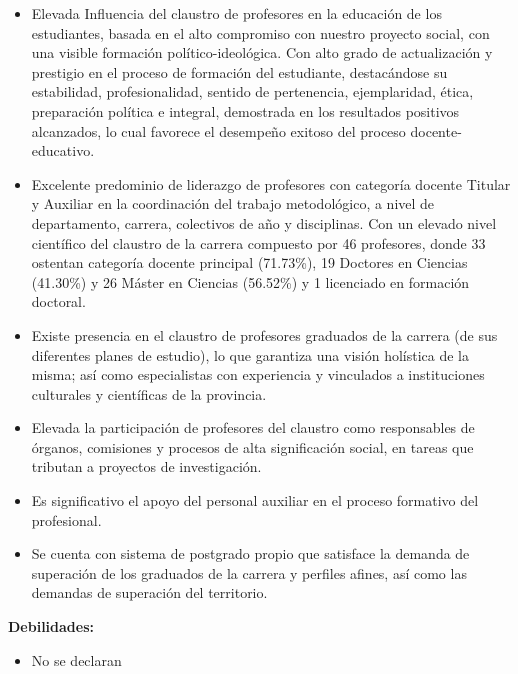 \begin{itemize}
	\setlength\itemsep{-0.5em}
	\item Elevada Influencia del claustro de profesores en la educación de los estudiantes, basada en el alto compromiso con nuestro proyecto social, con una visible formación político-ideológica. Con alto grado de actualización y prestigio en el proceso de formación del estudiante, destacándose su estabilidad, profesionalidad, sentido de pertenencia, ejemplaridad, ética, preparación política e integral, demostrada en los resultados positivos alcanzados, lo cual favorece el desempeño exitoso del proceso docente-educativo.
	\item Excelente predominio de liderazgo de profesores con categoría docente Titular y Auxiliar en la coordinación del trabajo metodológico, a nivel de departamento, carrera, colectivos de año y disciplinas. Con un elevado nivel científico del claustro de la carrera compuesto por 46 profesores, donde 33 ostentan categoría docente principal (71.73\%), 19 Doctores en Ciencias (41.30\%) y 26 Máster en Ciencias (56.52\%) y 1 licenciado en formación doctoral.
	\item Existe presencia en el claustro de profesores graduados de la carrera (de sus diferentes planes de estudio), lo que garantiza una visión holística de la misma; así como especialistas con experiencia y vinculados a instituciones culturales y científicas de la provincia.
	\item Elevada la participación de profesores del claustro como responsables de órganos, comisiones y procesos de alta significación social, en tareas que tributan a proyectos de investigación.
	\item Es significativo el apoyo del personal auxiliar en el proceso formativo del profesional.
	\item Se cuenta con sistema de postgrado propio que satisface la demanda de superación de los graduados de la carrera y perfiles afines, así como las demandas de superación del territorio.
\end{itemize}

\textbf{Debilidades:}

\begin{itemize}
	\setlength\itemsep{-0.5em}
	\item No se declaran
\end{itemize}